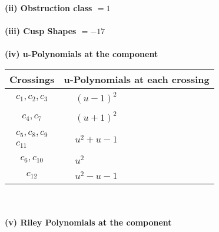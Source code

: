 \documentclass[1p]{elsarticle_modified}
\theoremstyle{definition}
\begin{document}
\flushleft \textbf{(ii) Obstruction class $= 1$}\\~\\
\flushleft \textbf{(iii) Cusp Shapes $= -17$}\\~\\
\newpage\renewcommand{\arraystretch}{1}
\flushleft \textbf{(iv) u-Polynomials at the component}\newline \\
\begin{tabular}{m{50pt}|m{274pt}}
Crossings & \hspace{64pt}u-Polynomials at each crossing \\
\hline $$\begin{aligned}c_{1},c_{2},c_{3}\end{aligned}$$&$\begin{aligned}
&(u-1)^2
\end{aligned}$\\
\hline $$\begin{aligned}c_{4},c_{7}\end{aligned}$$&$\begin{aligned}
&(u+1)^2
\end{aligned}$\\
\hline $$\begin{aligned}c_{5},c_{8},c_{9}\\c_{11}\end{aligned}$$&$\begin{aligned}
&u^2+u-1
\end{aligned}$\\
\hline $$\begin{aligned}c_{6},c_{10}\end{aligned}$$&$\begin{aligned}
&u^2
\end{aligned}$\\
\hline $$\begin{aligned}c_{12}\end{aligned}$$&$\begin{aligned}
&u^2- u-1
\end{aligned}$\\
\hline
\end{tabular}\\~\\
\newpage\renewcommand{\arraystretch}{1}
\flushleft \textbf{(v) Riley Polynomials at the component}\newline \\
\end{document}
